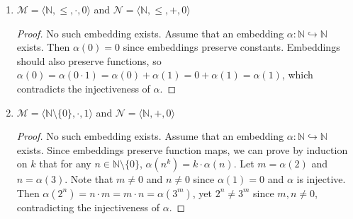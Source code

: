 \documentclass{article}
\begin{document}
\begin{enumerate}
\begin{enumerate}
      \item $\mathscr{M}=\langle\mathbb{N},\leq,\cdot,0\rangle$ and
        $\mathscr{N}=\langle\mathbb{N},\leq,+,0\rangle$
        \begin{proof}
          No such embedding exists. Assume that an embedding
          $\alpha:\mathbb{N}\hookrightarrow\mathbb{N}$ exists. Then
          $\alpha(0)=0$ since embeddings preserve constants. Embeddings
          should also preserve functions, so
          $\alpha(0)=\alpha(0\cdot1)=\alpha(0)+\alpha(1)=0+\alpha(1)=\alpha(1)$,
          which contradicts the injectiveness of $\alpha$.
        \end{proof}

      \item $\mathscr{M}=\langle\mathbb{N}\setminus\{0\},\cdot,1\rangle$ and
        $\mathscr{N}=\langle\mathbb{N},+,0\rangle$
        \begin{proof}
          No such embedding exists. Assume that an embedding
          $\alpha:\mathbb{N}\hookrightarrow\mathbb{N}$ exists. Since
          embeddings preserve function maps, we can prove by induction on
          $k$ that for any $n\in\mathbb{N}\setminus\{0\}$,
          $\alpha(n^k)=k\cdot \alpha(n)$.  Let $m=\alpha(2)$ and
          $n=\alpha(3)$. Note that $m\neq0$ and $n\neq0$ since
          $\alpha(1)=0$ and $\alpha$ is injective. Then $\alpha(2^n)=n\cdot
          m=m\cdot n=\alpha(3^m)$, yet $2^n\neq3^m$ since $m,n\neq0$,
          contradicting the injectiveness of $\alpha$.
        \end{proof}
    \end{enumerate}
\end{enumerate}
\end{document}
